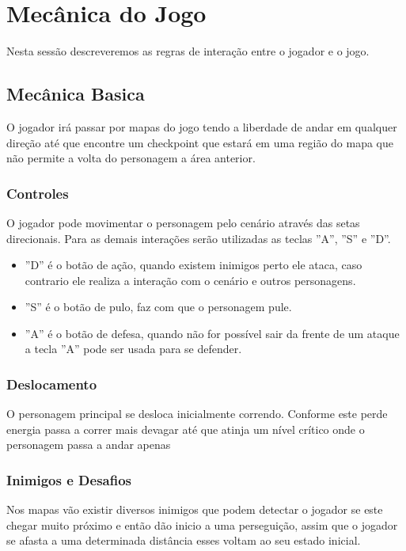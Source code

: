 \section{Mecânica do Jogo}


Nesta sessão descreveremos as regras de interação entre o jogador e o jogo.

\subsection {Mecânica Basica}

O jogador irá passar por mapas do jogo tendo a liberdade de andar em qualquer direção até que encontre um checkpoint que estará em uma região do mapa que não permite a volta do personagem a área anterior.

\subsubsection {Controles}

O jogador pode movimentar o personagem pelo cenário através das setas direcionais. Para as demais interações serão utilizadas as teclas ''A'', ''S'' e ''D''.
\begin{itemize}
\item ''D'' é o botão de ação, quando existem inimigos perto ele ataca, caso contrario ele realiza a interação com o cenário e outros personagens.
\item ''S'' é o botão de pulo, faz com que o personagem pule.
\item ''A'' é o botão de defesa, quando não for possível sair da frente de um ataque a tecla ''A'' pode ser usada para se defender.
\end{itemize}

\subsubsection {Deslocamento}

O personagem principal se desloca inicialmente correndo. Conforme este perde energia passa a correr mais devagar até que atinja um nível crítico
onde o personagem passa a andar apenas

\subsubsection {Inimigos e Desafios}

Nos mapas vão existir diversos inimigos que podem detectar o jogador se este chegar muito próximo 
e então dão inicio a uma perseguição, assim que o jogador se afasta a uma determinada distância esses voltam ao seu estado inicial. 

